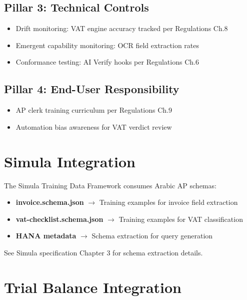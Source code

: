 \subsection{Pillar 3: Technical Controls}

\begin{itemize}
  \item Drift monitoring: VAT engine accuracy tracked per Regulations Ch.8
  \item Emergent capability monitoring: OCR field extraction rates
  \item Conformance testing: AI Verify hooks per Regulations Ch.6
\end{itemize}

\subsection{Pillar 4: End-User Responsibility}

\begin{itemize}
  \item AP clerk training curriculum per Regulations Ch.9
  \item Automation bias awareness for VAT verdict review
\end{itemize}

\section{Simula Integration}
\label{sec:simula-integration}

The Simula Training Data Framework consumes Arabic AP schemas:

\begin{itemize}
  \item \textbf{invoice.schema.json} $\rightarrow$ Training examples for invoice field extraction
  \item \textbf{vat-checklist.schema.json} $\rightarrow$ Training examples for VAT classification
  \item \textbf{HANA metadata} $\rightarrow$ Schema extraction for query generation
\end{itemize}

See Simula specification Chapter 3 for schema extraction details.

\section{Trial Balance Integration}
\label{sec:tb-integration}

